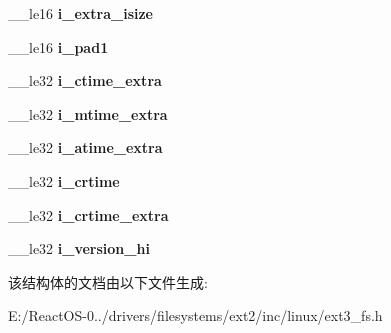 \begin{DoxyCompactItemize}
\begin{tabbing}
\end{tabbing}\item 
\mbox{\label{structext3__inode_aa09ff6df1f86fec5ed80364f45f59b3c}} 
\+\_\+\+\_\+le16 {\bfseries i\+\_\+extra\+\_\+isize}
\item 
\mbox{\label{structext3__inode_a89438e781531925f1e82bb357f044a68}} 
\+\_\+\+\_\+le16 {\bfseries i\+\_\+pad1}
\item 
\mbox{\label{structext3__inode_a66ea2e7fafaa82be6a69cef783fb2e63}} 
\+\_\+\+\_\+le32 {\bfseries i\+\_\+ctime\+\_\+extra}
\item 
\mbox{\label{structext3__inode_a462106fa2bc642183c98b096bb31f5b9}} 
\+\_\+\+\_\+le32 {\bfseries i\+\_\+mtime\+\_\+extra}
\item 
\mbox{\label{structext3__inode_a10d9383542bd3e774b2a7854615dd931}} 
\+\_\+\+\_\+le32 {\bfseries i\+\_\+atime\+\_\+extra}
\item 
\mbox{\label{structext3__inode_aaf7f6c6568e537281135dc1108dcd9b4}} 
\+\_\+\+\_\+le32 {\bfseries i\+\_\+crtime}
\item 
\mbox{\label{structext3__inode_a32cf1fa2e023c448fda1af36d0d52bf7}} 
\+\_\+\+\_\+le32 {\bfseries i\+\_\+crtime\+\_\+extra}
\item 
\mbox{\label{structext3__inode_a8bfabb3c4d226efca0ffd0d354f4dade}} 
\+\_\+\+\_\+le32 {\bfseries i\+\_\+version\+\_\+hi}
\end{DoxyCompactItemize}


该结构体的文档由以下文件生成\+:\begin{DoxyCompactItemize}
\item 
E\+:/\+React\+O\+S-\/0../drivers/filesystems/ext2/inc/linux/ext3\+\_\+fs.\+h\end{DoxyCompactItemize}
